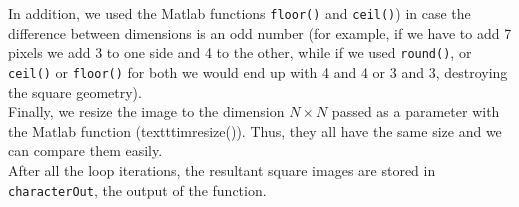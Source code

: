 In addition, we used the Matlab functions \texttt{floor()} and \texttt{ceil()}) in case the difference between dimensions is an odd number (for example, if we have to add 7 pixels we add 3 to one side and 4 to the other, while if we used \texttt{round()}, or \texttt{ceil()} or \texttt{floor()} for both we would end up with 4 and 4 or 3 and 3, destroying the square geometry).\\

Finally, we resize the image to the dimension $N \times N$ passed as a parameter with the Matlab function (texttt{imresize()}). Thus, they all have the same size and we can compare them easily.\\  

After all the loop iterations, the resultant square images are stored in \texttt{characterOut}, the output of the function. 
